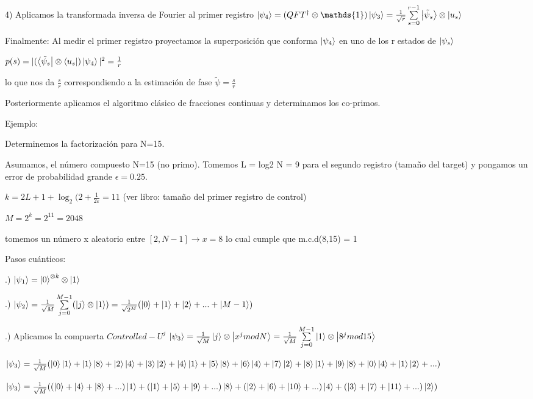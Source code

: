 \documentclass[11pt, spanish]{report}
\begin{document}
4) Aplicamos la transformada inversa de Fourier al primer registro $\ket{\psi_4} = (QFT^\dagger \otimes \mathds{1}) \ket{\psi_3} = \frac{1}{\sqrt{r}} \sum\limits_{s=0}^{r-1} \ket{\tilde{\psi}_s} \otimes \ket{u_s}$

Finalmente: Al medir el primer registro proyectamos la superposición que conforma $\ket{\psi_4}$ en uno de los r estados de $\ket{\psi_s}$

$p(s) = |(\bra{\tilde{\psi}_s} \otimes \bra{u_s}) \ket{\psi_4}|^2 = \frac{1}{r}$

lo que nos da $\frac{s}{r}$ correspondiendo a la estimación de fase $\tilde{\psi} = \frac{s}{r}$

Posteriormente aplicamos el algoritmo clásico de fracciones continuas y determinamos los co-primos.

Ejemplo:

Determinemos la factorización para N=15.

Asumamos, el número compuesto N=15 (no primo). Tomemos L = log2 N = 9 para el segundo registro (tamaño del target) y pongamos un error de probabilidad grande $\epsilon = 0.25$.

$k = 2L + 1 + \log_2(2 + \frac{1}{2 \varepsilon} = 11$ (ver libro: tamaño del primer registro de control)

$M = 2^k = 2^{11} = 2048$

tomemos un número x aleatorio entre $[2, N-1] \rightarrow x = 8$ lo cual cumple que m.c.d(8,15) = 1

Pasos cuánticos:

.) $\ket{\psi_1} = \ket{0}^{\otimes k} \otimes \ket{1}$

.) $\ket{\psi_2} = \frac{1}{\sqrt{M}} \sum\limits_{j=0}^{M-1} (\ket{j} \otimes \ket{1}) = \frac{1}{\sqrt{2^M}} (\ket{0} + \ket{1} + \ket{2} + ... + \ket{M-1})$

.) Aplicamos la compuerta $Controlled-U^j$ $\ket{\psi_3} = \frac{1}{\sqrt{M}} \ket{j} \otimes \ket{x^j mod N} = \frac{1}{\sqrt{M}} \sum\limits_{j=0}^{M-1} \ket{1} \otimes \ket{8^j mod 15}$

$\ket{\psi_3} = \frac{1}{\sqrt{M}} (\ket{0}\ket{1} + \ket{1}\ket{8} + \ket{2}\ket{4} + \ket{3}\ket{2} + \ket{4}\ket{1} + \ket{5}\ket{8} + \ket{6}\ket{4} + \ket{7}\ket{2} + \ket{8}\ket{1} + \ket{9}\ket{8} + \ket{0}\ket{4} + \ket{1}\ket{2} + ...)$

$\ket{\psi_3} = \frac{1}{\sqrt{M}} ((\ket{0} + \ket{4} + \ket{8} + ...)\ket{1} + (\ket{1} + \ket{5} + \ket{9} + ...) \ket{8} + (\ket{2} + \ket{6} + \ket{10} + ...) \ket{4} + (\ket{3} + \ket{7} + \ket{11} + ...) \ket{2})$
\end{document}
